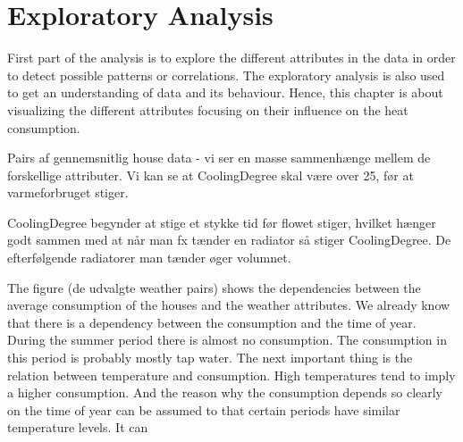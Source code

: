 \chapter{Exploratory Analysis}
First part of the analysis is to explore the different attributes in the data in order to detect possible patterns or correlations. The exploratory analysis is also used to get an understanding of data and its behaviour. Hence, this chapter is about visualizing the different attributes focusing on their influence on the heat consumption. 


Pairs af gennemsnitlig house data - vi ser en masse sammenhænge mellem de forskellige attributer. Vi kan se at CoolingDegree skal være over 25, før at varmeforbruget stiger.

CoolingDegree begynder at stige et stykke tid før flowet stiger, hvilket hænger godt sammen med at når man fx tænder en radiator så stiger CoolingDegree. De efterfølgende radiatorer man tænder øger volumnet. 


The figure (de udvalgte weather pairs) shows the dependencies between the average consumption of the houses and the weather attributes.
We already know that there is a dependency between the consumption and the time of year. During the summer period there
is almost no consumption. The consumption in this period is probably mostly tap water. The next important thing is the relation
between temperature and consumption. High temperatures tend to imply a higher consumption. And the reason why the consumption
depends so clearly on the time of year can be assumed to that certain periods have similar temperature levels. 
It can 